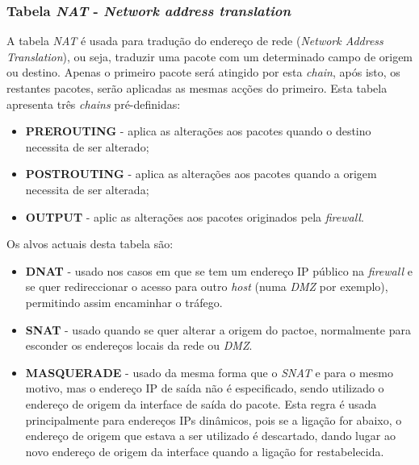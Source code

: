 \subsubsection{Tabela \textit{NAT} - \textit{Network address translation}}

A tabela \textit{NAT} é usada para tradução do endereço de rede (\textit{Network Address Translation}), ou seja, traduzir uma pacote com um determinado campo de origem ou destino.
Apenas o primeiro pacote será atingido por esta \textit{chain}, após isto, os restantes pacotes, serão aplicadas as mesmas acções do primeiro.
Esta tabela apresenta três \textit{chains} pré-definidas:

\begin{itemize}
    \item \textbf{PREROUTING} - aplica as alterações aos pacotes quando o destino necessita de ser alterado;
    \item \textbf{POSTROUTING} - aplica as alterações aos pacotes quando a origem necessita de ser alterada;
    \item \textbf{OUTPUT} - aplic as alterações aos pacotes originados pela \textit{firewall}.
\end{itemize}

Os alvos actuais desta tabela são:

\begin{itemize}
    \item \textbf{DNAT} - usado nos casos em que se tem um endereço IP público na \textit{firewall} e se quer redireccionar o acesso para outro \textit{host} (numa \textit{DMZ} por exemplo), permitindo assim encaminhar o tráfego.
    \item \textbf{SNAT} - usado quando se quer alterar a origem do pactoe, normalmente para esconder os endereços locais da rede ou \textit{DMZ}.
    \item \textbf{MASQUERADE} - usado da mesma forma que o \textit{SNAT} e para o mesmo motivo, mas o endereço IP de saída não é especificado, sendo utilizado o endereço de origem da interface de saída do pacote. Esta regra é usada principalmente para endereços IPs dinâmicos, pois se a ligação for abaixo, o endereço de origem que estava a ser utilizado é descartado, dando lugar ao novo endereço de origem da interface quando a ligação for restabelecida.
\end{itemize}


